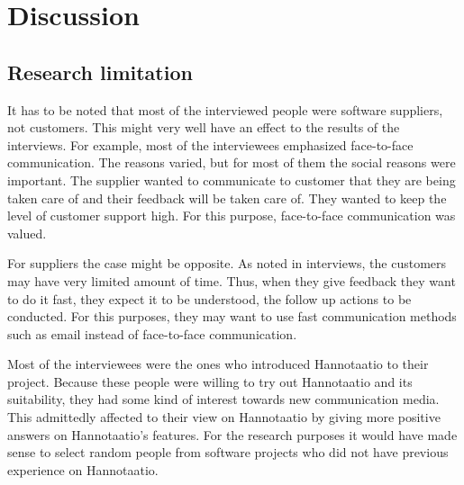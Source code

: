 \documentclass[english,12pt,a4paper,pdftex]{article}
\begin{document}
\clearpage

\section{Discussion}
\acresetall

\subsection{Research limitation}

It has to be noted that most of the interviewed people were software suppliers, not customers. This might very well have an effect to the results of the interviews. For example, most of the interviewees emphasized face-to-face communication. The reasons varied, but for most of them the social reasons were important. The supplier wanted to communicate to customer that they are being taken care of and their feedback will be taken care of. They wanted to keep the level of customer support high. For this purpose, face-to-face communication was valued. 

For suppliers the case might be opposite. As noted in interviews, the customers may have very limited amount of time. Thus, when they give feedback they want to do it fast, they expect it to be understood, the follow up actions to be conducted. For this purposes, they may want to use fast communication methods such as email instead of face-to-face communication.

Most of the interviewees were the ones who introduced Hannotaatio to their project. Because these people were willing to try out Hannotaatio and its suitability, they had some kind of interest towards new communication media. This admittedly affected to their view on Hannotaatio by giving more positive answers on Hannotaatio's features. For the research purposes it would have made sense to select random people from software projects who did not have previous experience on Hannotaatio. 
\end{document}
